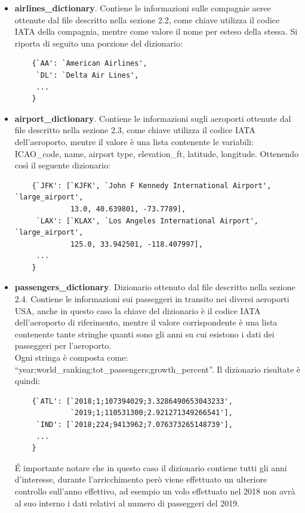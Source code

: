 \documentclass[12pt]{article}
\begin{document}
\begin{itemize}
     \item \textbf{airlines\_dictionary}. Contiene le informazioni sulle compagnie aeree ottenute dal file descritto nella sezione 2.2, come chiave utilizza il codice IATA della compagnia, mentre come valore il nome per esteso della stessa. Si riporta di seguito una porzione del dizionario:
     \begin{verbatim}
    {`AA': `American Airlines',
     `DL': `Delta Air Lines',
     ...
    }      
     \end{verbatim}
     \item \textbf{airport\_dictionary}. Contiene le informazioni sugli aeroporti ottenute dal file descritto nella sezione 2.3, come chiave utilizza il codice IATA dell'aeroporto, mentre il valore è una lista contenente le variabili: ICAO\_code, name, airport type, elevation\_ft, latitude, longitude. Ottenendo così il seguente dizionario:
     \begin{verbatim}
    {`JFK': [`KJFK', `John F Kennedy International Airport', `large_airport', 
             13.0, 40.639801, -73.7789],
     `LAX': [`KLAX', `Los Angeles International Airport', `large_airport', 
             125.0, 33.942501, -118.407997],
     ...
    }
    \end{verbatim}
     \item \textbf{passengers\_dictionary}. Dizionario ottenuto dal file descritto nella sezione 2.4. Contiene le informazioni sui passeggeri in transito nei diversi aeroporti USA, anche in questo caso la chiave del dizionario è il codice IATA dell'aeroporto di riferimento, mentre il valore corrispondente è una lista contenente tante stringhe quanti sono gli anni su cui esistono i dati dei passeggeri per l'aeroporto. \\
     Ogni stringa è composta come: ``year;world\_ranking;tot\_passengers;growth\_percent''. Il dizionario risultate è quindi:
     \begin{verbatim}
    {`ATL': [`2018;1;107394029;3.3286490653043233',
             `2019;1;110531300;2.921271349266541'],
     `IND': [`2018;224;9413962;7.076373265148739'],
     ...
    }
    \end{verbatim}    
    \'E importante notare che in questo caso il dizionario contiene tutti gli anni d'interesse, durante l'arricchimento però viene effettuato un ulteriore controllo sull'anno effettivo, ad esempio un volo effettuato nel 2018 non avrà al suo interno i dati relativi al numero di passeggeri del 2019.
\end{itemize}
\end{document}
